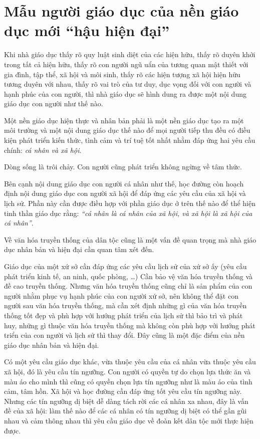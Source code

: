 \chapter{Mẫu người giáo dục của nền giáo dục mới ``hậu hiện đại''} %
\label{cha:mau_nguoi_giao_duc_cua_nen_giao_duc_moi}

Khi nhà giáo dục thấy rõ quy luật sinh diệt của các hiện hữu, thấy rõ duyên khởi trong tất cả hiện hữu, thấy rõ con người ngũ uẩn của tương quan mật thiết với gia đình, tập thể, xã hội và môi sinh, thấy rõ các hiện tượng xã hội hiện hữu tương duyên với nhau, thấy rõ vai trò của tư duy, dục vọng đối với con người và hạnh phúc của con người, thì nhà giáo dục sẽ hình dung ra được một nội dung giáo dục con người như thế nào.

Một nền giáo dục hiện thực và nhân bản phải là một nền giáo dục tạo ra một môi trường và một nội dung giáo dục thế nào để mọi người tiếp thu đều có điều kiện phát triển kiến thức, tình cảm và trí tuệ tốt nhất nhằm đáp ứng hai yêu cầu chính: \emph{cá nhân và xã hội}.

Dòng sống là trôi chảy. Con người cũng phát triển không ngừng về tâm thức.

Bên cạnh nội dung giáo dục con người cá nhân như thế, học đường còn hoạch định nội dung giáo dục con người xã hội để đáp ứng các yêu cầu của xã hội và lịch sử. Phần này cần được điều hợp với phần giáo dục ở trên thế nào để thể hiện tinh thần giáo dục rằng: \emph{``cá nhân là cá nhân của xã hội, và xã hội là xã hội của cá nhân''}.

Về văn hóa truyền thống của dân tộc cũng là một vấn đề quan trọng mà nhà giáo dục nhân bản và hiện đại cần quan tâm xét đến.

Giáo dục của một xứ sở cần đáp ứng các yêu cầu lịch sử của xứ sở ấy (yêu cầu phát triển kinh tế, an ninh, quốc phòng, \ldots) Cần bảo vệ văn hóa truyền thống và đề cao truyền thống. Nhưng văn hóa truyền thống cũng chỉ là sản phẩm của con người nhằm phục vụ hạnh phúc của con người xứ sở, nên không thể đặt con người sau văn hóa truyền thống, mà cần xét định những gì của văn hóa truyền thống tốt đẹp và phù hợp với hướng phát triển của lịch sử thì bảo trì và phát huy, những gì thuộc văn hóa truyền thống mà không còn phù hợp với hướng phát triển của con người và lịch sử thì thay đổi. Đây cũng là một đặc điểm của nền giáo dục nhân bản và hiện đại.

Có một yêu cầu giáo dục khác, vừa thuộc yêu cầu của cá nhân vừa thuộc yêu cầu xã hội, đó là yêu cầu tín ngưỡng. Con người có quyền tự do chọn lựa thức ăn và màu áo cho mình thì cũng có quyền chọn lựa tín ngưỡng như là màu áo của tình cảm, tâm hồn. Xã hội và học đường cần đáp ứng tốt yêu cầu tín ngưỡng này. Nhưng các tín ngưỡng dị biệt dễ dàng tách rời các cá nhân xa nhau, đây là vấn đề của xã hội: làm thế nào để các cá nhân có tín ngưỡng dị biệt có thể gần gũi nhau và cảm thông nhau thì yêu cầu giáo dục về đoàn kết dân tộc mới thực hiện được.

